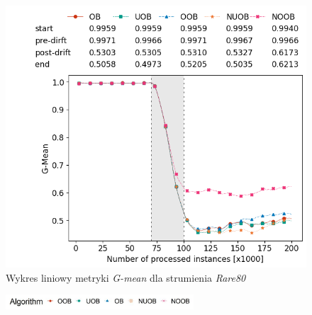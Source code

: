 \begin{figure}[h]
    \centering
    \includegraphics[width=12cm]{figures/rare80_gmean.png}
    \caption{Wykres liniowy metryki \textit{G-mean} dla strumienia \textit{Rare80}}\label{Figure:Rare80}
\end{figure}

\begin{figure}[h]
    \centering
    \includegraphics[width=7cm]{figures/algorithms_legend.JPG}
\end{figure}

\vspace{-1.2cm}

